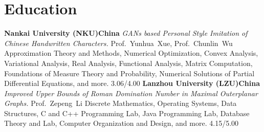 \documentclass[11pt,a4paper, final]{moderncv}
\begin{document}
\section{\textbf{Education}}
	{\textbf{Nankai University (NKU)}}{}{\textbf{China}}{}
	{\emph{GANs based Personal Style Imitation of Chinese Handwritten Characters.}}
	{Prof.~Yunhua~Xue, Prof.~Chunlin~Wu}
	{Approximation Theory and Methods, Numerical Optimization, Convex Analysis, 
	Variational Analysis, Real Analysis, Functional Analysis, Matrix Computation, 
	Foundations of Measure Theory and Probability, Numerical Solutions of Partial Differential Equations, and more.}
	{3.06/4.00}
	{\textbf{Lanzhou University (LZU)}}{}{\textbf{China}}{}
	{\emph{Improved Upper Bounds of Roman Domination Number in Maximal Outerplanar Graphs.}}
	{Prof.~Zepeng~Li}
	{Discrete Mathematics, Operating Systems, Data Structures, C and C++ Programming Lab, 
	Java Programming Lab, Database Theory and Lab, Computer Organization and Design, and more.}
	{4.15/5.00}
\end{document}
